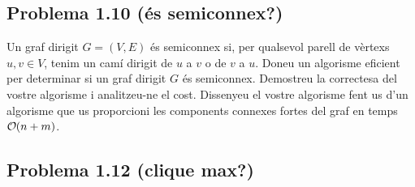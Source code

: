 \documentclass[a4paper,12pt]{article}
\DeclareRobustCommand{\bigO}{%
  \text{\usefont{OMS}{cmsy}{m}{n}O}%
}
\begin{document}
\subsection*{Problema 1.10 (és semiconnex?)}
Un graf dirigit $G = (V, E)$ és semiconnex si, per qualsevol parell de vèrtexs $u, v \in V$, tenim un camí dirigit de $u$ a $v$ o de $v$ a $u$.
Doneu un algorisme eficient per determinar si un graf dirigit $G$ és semiconnex. Demostreu la correctesa del vostre algorisme i analitzeu-ne el cost. Dissenyeu el vostre algorisme fent us d'un algorisme que us proporcioni les components connexes fortes del graf en temps $\bigO(n + m)$.

\subsection*{Problema 1.12 (clique max?)}

















\newpage

$$$$

\vfill
\end{document}
